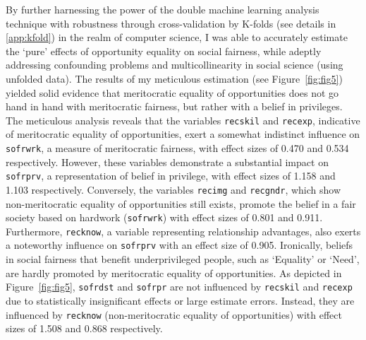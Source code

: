 By further harnessing the power of the double machine learning analysis technique with robustness through cross-validation by K-folds (see details in \ref{app:kfold}) in the realm of computer science, I was able to accurately estimate the ‘pure’ effects of opportunity equality on social fairness, while adeptly addressing confounding problems and multicollinearity in social science (using unfolded data). 
The results of my meticulous estimation (see Figure~\ref{fig:fig5}) yielded solid evidence that meritocratic equality of opportunities does not go hand in hand with meritocratic fairness, but rather with a belief in privileges. The meticulous analysis reveals that the variables \texttt{recskil} and \texttt{recexp}, indicative of meritocratic equality of opportunities, exert a somewhat indistinct influence on \texttt{sofrwrk}, a measure of meritocratic fairness, with effect sizes of 0.470 and 0.534 respectively. However, these variables demonstrate a substantial impact on \texttt{sofrprv}, a representation of belief in privilege, with effect sizes of 1.158 and 1.103 respectively. Conversely, the variables \texttt{recimg} and \texttt{recgndr}, which show non-meritocratic equality of opportunities still exists, promote the belief in a fair society based on hardwork (\texttt{sofrwrk}) with effect sizes of 0.801 and 0.911. Furthermore, \texttt{recknow}, a variable representing relationship advantages, also exerts a noteworthy influence on \texttt{sofrprv} with an effect size of 0.905. Ironically, beliefs in social fairness that benefit underprivileged people, such as ‘Equality’ or ‘Need’, are hardly promoted by meritocratic equality of opportunities. As depicted in Figure~\ref{fig:fig5}, \texttt{sofrdst} and \texttt{sofrpr} are not influenced by \texttt{recskil} and \texttt{recexp} due to statistically insignificant effects or large estimate errors. Instead, they are influenced by \texttt{recknow} (non-meritocratic equality of opportunities) with effect sizes of 1.508 and 0.868 respectively.

